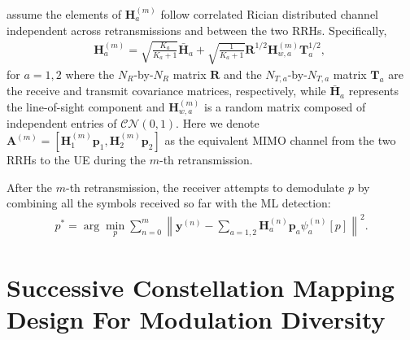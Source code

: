 \documentclass[journal]{IEEEtran}
\begin{document}
assume the elements of $\mathbf{H}_a^{(m)}$ follow correlated Rician
distributed channel~\cite{taricco2007optimum} independent across retransmissions
and between the two RRHs.
Specifically,
\begin{align}
    \mathbf{H}_a^{(m)} = \sqrt{\frac{K_a}{K_a+1}}\bar{\mathbf{H}}_{a} +
    \sqrt{\frac{1}{K_a+1}}
    \mathbf{R}^{1/2}\mathbf{H}_{w,a}^{(m)}\mathbf{T}_a^{1/2},\; 
\end{align}
for $a=1,2$ where the $N_R$-by-$N_R$ matrix $\mathbf{R}$ and the $N_{T,
a}$-by-$N_{T,a}$ matrix $\mathbf{T}_a$ are the receive and transmit covariance matrices,
respectively, while $\bar{\mathbf{H}}_{a}$ represents the line-of-sight
component and $\mathbf{H}_{w,a}^{(m)}$ is a random matrix composed of
independent entries of $\mathcal{CN}(0,1)$. Here we denote $\mathbf{A}^{(m)} =
[\mathbf{H}_1^{(m)}\mathbf{p}_1, \mathbf{H}_2^{(m)}\mathbf{p}_2]$ as the
equivalent MIMO channel from the two RRHs to the UE during the $m$-th
retransmission.

After the $m$-th retransmission, the receiver attempts to
demodulate $p$ by combining all the symbols received so far with the ML
detection:
\begin{align}
    p^* = \arg\min_p\sum_{n = 0}^{m}\left\|\mathbf{y}^{(n)} -
    \sum_{a=1,2}\mathbf{H}_a^{(n)}\mathbf{p}_a\psi_a^{(n)}[p]\right\|^2.
\end{align}

\section{Successive Constellation Mapping Design For Modulation Diversity}
\label{sec:modiv}
\end{document}
